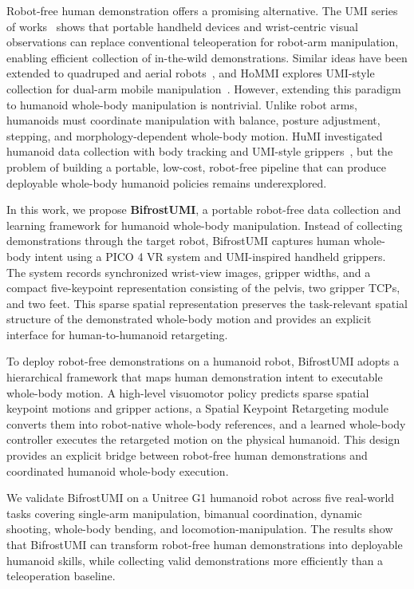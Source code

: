 \documentclass[letterpaper, 10 pt, conference]{ieeeconf}  %
\begin{document}
Robot-free human demonstration offers a promising alternative. The UMI series of works~\cite{umi, omniumi,scalinglaw,umift, activeumi} shows that portable handheld devices and wrist-centric visual observations can replace conventional teleoperation for robot-arm manipulation, enabling efficient collection of in-the-wild demonstrations. Similar ideas have been extended to quadruped and aerial robots~\cite{umionleg,umionair}, and HoMMI explores UMI-style collection for dual-arm mobile manipulation~\cite{hommi}. However, extending this paradigm to humanoid whole-body manipulation is nontrivial. Unlike robot arms, humanoids must coordinate manipulation with balance, posture adjustment, stepping, and morphology-dependent whole-body motion. HuMI investigated humanoid data collection with body tracking and UMI-style grippers~\cite{humi}, but the problem of building a portable, low-cost, robot-free pipeline that can produce deployable whole-body humanoid policies remains underexplored.

In this work, we propose \textbf{BifrostUMI}, a portable robot-free data collection and learning framework for humanoid whole-body manipulation. Instead of collecting demonstrations through the target robot, BifrostUMI captures human whole-body intent using a PICO 4 VR system and UMI-inspired handheld grippers. The system records synchronized wrist-view images, gripper widths, and a compact five-keypoint representation consisting of the pelvis, two gripper TCPs, and two feet. This sparse spatial representation preserves the task-relevant spatial structure of the demonstrated whole-body motion and provides an explicit interface for human-to-humanoid retargeting.

To deploy robot-free demonstrations on a humanoid robot, BifrostUMI adopts a hierarchical framework that maps human demonstration intent to executable whole-body motion. A high-level visuomotor policy predicts sparse spatial keypoint motions and gripper actions, a Spatial Keypoint Retargeting module converts them into robot-native whole-body references, and a learned whole-body controller executes the retargeted motion on the physical humanoid. This design provides an explicit bridge between robot-free human demonstrations and coordinated humanoid whole-body execution.

We validate BifrostUMI on a Unitree G1 humanoid robot across five real-world tasks covering single-arm manipulation, bimanual coordination, dynamic shooting, whole-body bending, and locomotion-manipulation. The results show that BifrostUMI can transform robot-free human demonstrations into deployable humanoid skills, while collecting valid demonstrations more efficiently than a teleoperation baseline.
\end{document}
